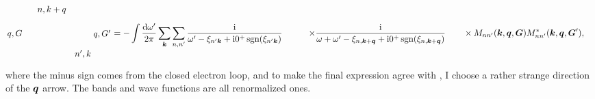 \documentclass[hyperref, a4paper, 12pt]{report}
\DeclareMathOperator{\sgn}{sgn}
\newcommand*{\ii}{\mathrm{i}}
\def\\{}%
\begin{document}
\begin{equation}
\begin{aligned}
\begin{gathered}
\begin{tikzpicture}[x=0.75pt,y=0.75pt,yscale=-1,xscale=1]
                \draw (35.5,59) node [anchor=east] [inner sep=0.75pt]    {$q,G$};
                \draw (141.52,59) node [anchor=west] [inner sep=0.75pt]    {$q,G'$};
                \draw (113,82) node [anchor=north west][inner sep=0.75pt]    {$n',k$};
                \draw (56,15) node [anchor=north west][inner sep=0.75pt]    {$n,k+q$};
                
                
                \end{tikzpicture}            
        \end{gathered} \\
        &= - \int \frac{\dd{\omega'}}{2\pi} \sum_{\vb*{k}} \sum_{n, n'}
        \frac{\ii}{\omega' - \xi_{n' \vb*{k}} + \ii 0^+ \sgn(\xi_{n' \vb*{k}})} \\
        &\quad \quad \times \frac{\ii}{\omega + \omega' - \xi_{n, \vb*{k} + \vb*{q}} + \ii 0^+ \sgn(\xi_{n, \vb*{k} + \vb*{q}})} \\
        &\quad \quad \times M_{n n' } (\vb*{k}, \vb*{q}, \vb*{G}) M_{nn'}^* (\vb*{k}, \vb*{q}, \vb*{G}') ,
    \end{aligned}
\end{equation}
where the minus sign comes from the closed electron loop,
and to make the final expression agree with \cite{berkeleygw},
I choose a rather strange direction of the $\vb*{q}$ arrow.
The bands and wave functions are all renormalized ones.
\end{document}
